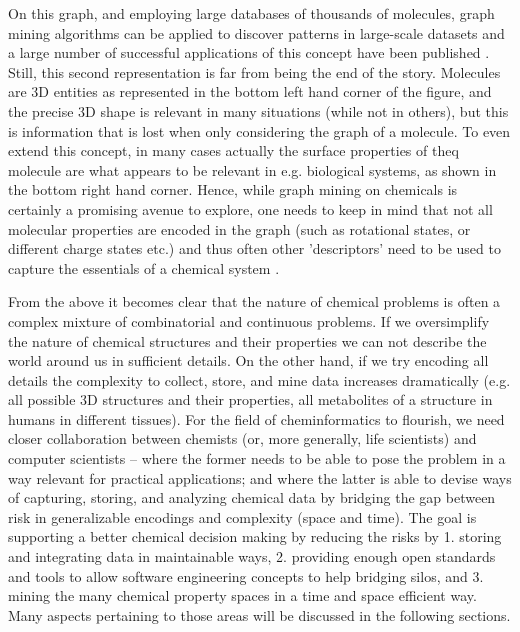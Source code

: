 \documentclass{sig-alternate}
\begin{document}

On this graph, and employing large databases of thousands of molecules, graph
mining algorithms can be applied to discover patterns in large-scale datasets
and a large number of successful applications of this concept have been
published \cite{wegner2006,horst2009}. Still, this second representation is far
from being the end of the story. Molecules are 3D entities as represented in the
bottom left hand corner of the figure, and the precise 3D shape is relevant in
many situations (while not in others), but this is information that is lost when
only considering the graph of a molecule. To even extend this concept, in many
cases actually the surface properties of theq molecule are what appears to be
relevant in e.g. biological systems, as shown in the bottom right hand corner.
Hence, while graph mining on chemicals is certainly a promising avenue to
explore, one needs to keep in mind that not all molecular properties are encoded
in the graph (such as rotational states, or different charge states etc.) and
thus often other 'descriptors' need to be used to capture the essentials of a
chemical system \cite{bender2004}.

From the above it becomes clear that the nature of chemical problems is often a
complex mixture of combinatorial and continuous problems. If we oversimplify the
nature of chemical structures and their properties we can not describe the world
around us in sufficient details. On the other hand, if we try encoding all
details the complexity to collect, store, and mine data increases dramatically
(e.g. all possible 3D structures and their properties, all metabolites of a
structure in humans in different tissues). For the field of cheminformatics to
flourish, we need closer collaboration between chemists (or, more generally,
life scientists) and computer scientists – where the former needs to be able to
pose the problem in a way relevant for practical applications; and where the
latter is able to devise ways of capturing, storing, and analyzing chemical data
by bridging the gap between risk in generalizable encodings and complexity
(space and time). The goal is supporting a better chemical decision making by
reducing the risks by 1. storing and integrating data in maintainable ways, 2.
providing enough open standards and tools to allow software engineering concepts
to help bridging silos, and 3. mining the many chemical property spaces in a
time and space efficient way. Many aspects pertaining to those areas will be
discussed in the following sections.
\end{document}
